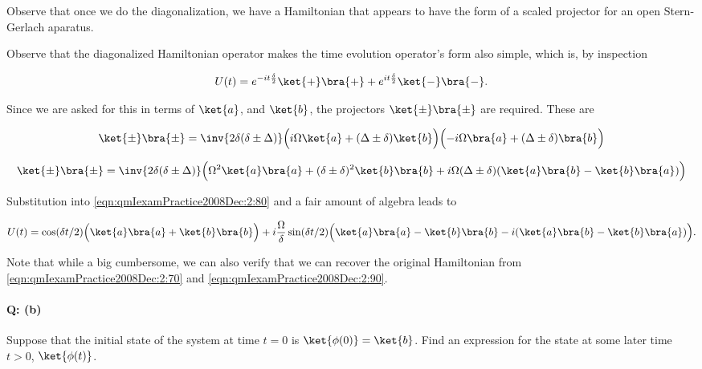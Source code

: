 Observe that once we do the diagonalization, we have a Hamiltonian that appears to have the form of a scaled projector for an open Stern-Gerlach aparatus.

Observe that the diagonalized Hamiltonian operator makes the time evolution operator's form also simple, which is, by inspection

\begin{equation}\label{eqn:qmIexamPractice2008Dec:2:80}
U(t) = 
e^{-i t \frac{\delta}{2}} \ket{+}\bra{+} 
+ e^{i t \frac{\delta}{2}} \ket{-}\bra{-}.
\end{equation}

Since we are asked for this in terms of $\ket{a}$, and $\ket{b}$, the projectors $\ket{\pm}\bra{\pm}$ are required.  These are

\begin{align*}
\ket{\pm}\bra{\pm} 
&= \inv{2 \delta (\delta \pm \Delta)}
\Bigl( i \Omega \ket{a} + (\Delta \pm \delta) \ket{b} \Bigr)
\Bigl( -i \Omega \bra{a} + (\Delta \pm \delta) \bra{b} \Bigr) \\
\end{align*}

\begin{equation}\label{eqn:qmIexamPractice2008Dec:2:90}
\ket{\pm}\bra{\pm} 
= \inv{2 \delta (\delta \pm \Delta)}
\Bigl(
\Omega^2 \ket{a}\bra{a}
+(\delta \pm \delta)^2 \ket{b}\bra{b}
+i \Omega (\Delta \pm \delta) (
\ket{a}\bra{b}
-\ket{b}\bra{a}
)
\Bigr)
\end{equation}

Substitution into \ref{eqn:qmIexamPractice2008Dec:2:80} and a fair amount of algebra leads to

\begin{equation}\label{eqn:qmIexamPractice2008Dec:2:100}
U(t) = 
\cos(\delta t/2) \Bigl( \ket{a}\bra{a} + \ket{b}\bra{b} \Bigr)
+ i \frac{\Omega}{\delta} \sin(\delta t/2) \Bigl( 
\ket{a}\bra{a} - \ket{b}\bra{b} 
-i (\ket{a}\bra{b} - \ket{b}\bra{a} )
\Bigr).
\end{equation}

Note that while a big cumbersome, we can also verify that we can recover the original Hamiltonian from \ref{eqn:qmIexamPractice2008Dec:2:70} and \ref{eqn:qmIexamPractice2008Dec:2:90}.

\paragraph{Q: (b)}

Suppose that the initial state of the system at time $t = 0$ is $\ket{\phi(0)}= \ket{b}$.  Find an expression for the state at some later time $t > 0$, $\ket{\phi(t)}$.

